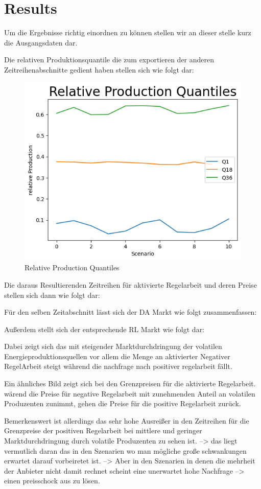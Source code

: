 \chapter{Results}

Um die Ergebnisse richtig einordnen zu können stellen wir an dieser stelle kurz die Ausgangsdaten dar.

Die relativen Produktionsquantile die zum exportieren der anderen Zeitreihenabschnitte gedient haben stellen sich wie folgt dar:

\begin{figure}[!h]
	\includegraphics[width=0.7\linewidth]{pictures/results/relativeProduktionQuantils.png}
	\caption{Relative Production Quantiles}
	\label{fig:Relative Production Quantiles}
\end{figure}

Die daraus Resultierenden Zeitreihen für aktivierte Regelarbeit und deren Preise stellen sich dann wie folgt dar:

Für den selben Zeitabschnitt lässt sich der DA Markt wie folgt zusammenfassen:


Außerdem stellt sich der entsprechende RL Markt wie folgt dar:

Dabei zeigt sich das mit steigender Marktdurchdringung der volatilen Energieproduktionsquellen vor allem die Menge an aktivierter Negativer
RegelArbeit steigt während die nachfrage nach positiver regelarbeit fällt.

Ein ähnliches Bild zeigt sich bei den Grenzpreisen für die aktivierte Regelarbeit. wärend die Preise für negative Regelarbeit mit
zunehmenden Anteil an volatilen Produzenten zunimmt, gehen die Preise für die positive Regelarbeit zurück.

Bemerkenswert ist allerdings das sehr hohe Ausreißer in den Zeitreihen für die Grenzpreise der  positiven Regelarbeit bei mittlere und geringer
Marktdurchdringung durch volatile Produzenten zu sehen ist.
--> das liegt vermutlich daran das in den Szenarien wo man mögliche große schwankungen erwartet darauf vorbeiretet ist.
--> Aber in den Szenarien in denen die mehrheit der Anbieter nicht damit rechnet scheint eine unerwartet hohe Nachfrage
--> einen preisschock aus zu lösen.

